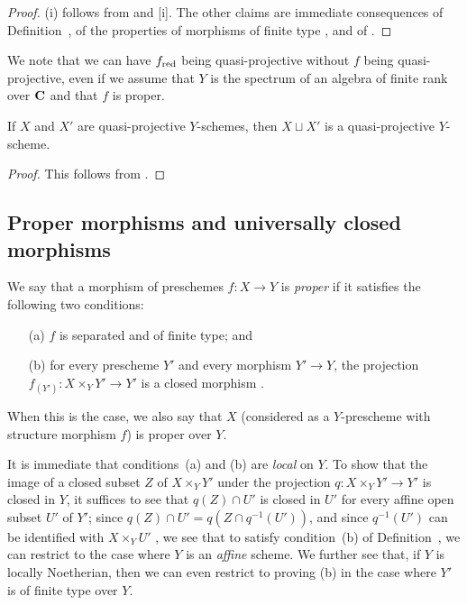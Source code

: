 \begin{proof}
(i) follows from  and [i].
The other claims are immediate consequences of Definition~, of the properties of morphisms of finite type , and of .
\end{proof}

\begin{remark}[5.3.5]
\label{II.5.3.5}
We note that we can have $f_{\mathrm{red}}$ being quasi-projective without $f$ being quasi-projective, even if we assume that $Y$ is the spectrum of an algebra of finite rank over $\mathbf{C}$ and that $f$ is proper.
\end{remark}

\begin{corollary}[5.3.6]
\label{II.5.3.6}
If $X$ and $X'$ are quasi-projective $Y$-schemes, then $X\sqcup X'$ is a quasi-projective $Y$-scheme.
\end{corollary}

\begin{proof}
This follows from .
\end{proof}

\subsection{Proper morphisms and universally closed morphisms}
\label{subsection:II.5.4}

\begin{definition}[5.4.1]
\label{II.5.4.1}
We say that a morphism of preschemes $f:X\to Y$ is \emph{proper} if it satisfies the following two conditions:
\begin{enumerate}
  \item[(a)] $f$ is separated and of finite type; and
  \item[(b)] for every prescheme $Y'$ and every morphism $Y'\to Y$, the projection $f_{(Y')}:X\times_Y Y'\to Y'$ is a closed morphism .
\end{enumerate}

When this is the case, we also say that $X$ (considered as a $Y$-prescheme with structure morphism $f$) is proper over $Y$.
\end{definition}

It is immediate that conditions~(a) and (b) are \emph{local} on $Y$.
To show that the image of a closed subset $Z$ of $X\times_Y Y'$ under the projection $q:X\times_Y Y'\to Y'$ is closed in $Y$, it suffices to see that $q(Z)\cap U'$ is closed in $U'$ for every affine open subset $U'$ of $Y'$;
since $q(Z)\cap U'=q(Z\cap q^{-1}(U'))$, and since $q^{-1}(U')$ can be identified with $X\times_Y U'$ , we see that to satisfy condition~(b) of Definition~, we can restrict to the case where $Y$ is an \emph{affine} scheme.
We further see  that, if $Y$ is locally Noetherian, then we can even restrict to proving (b) in the case where $Y'$ is of finite type over $Y$.

